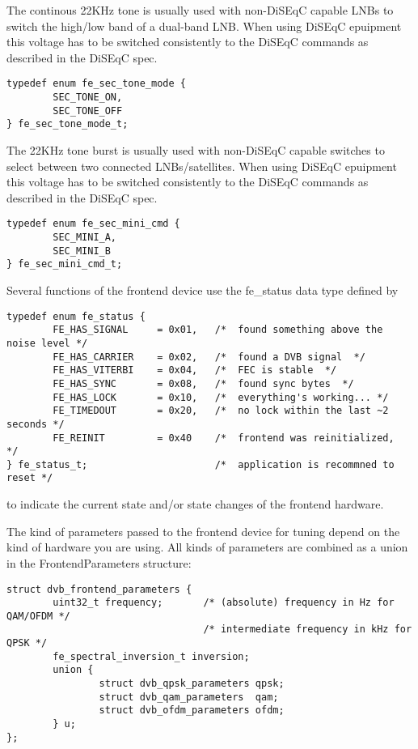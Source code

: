 \label{sectone}

The continous 22KHz tone is usually used with non-DiSEqC capable LNBs to
switch the high/low band of a dual-band LNB.
When using DiSEqC epuipment this voltage has to be switched consistently 
to the DiSEqC commands as described in the DiSEqC spec.

\begin{verbatim}
typedef enum fe_sec_tone_mode {
        SEC_TONE_ON,
        SEC_TONE_OFF
} fe_sec_tone_mode_t;
\end{verbatim}

\label{sectoneburst}

The 22KHz tone burst is usually used with non-DiSEqC capable
switches to select between two connected LNBs/satellites.
When using DiSEqC epuipment this voltage has to be switched consistently 
to the DiSEqC commands as described in the DiSEqC spec.

\begin{verbatim}
typedef enum fe_sec_mini_cmd {
        SEC_MINI_A,
        SEC_MINI_B
} fe_sec_mini_cmd_t;
\end{verbatim}


\label{frontendstatus}

Several functions of the frontend device use the fe\_status data 
type defined by
\begin{verbatim}
typedef enum fe_status {
        FE_HAS_SIGNAL     = 0x01,   /*  found something above the noise level */
        FE_HAS_CARRIER    = 0x02,   /*  found a DVB signal  */
        FE_HAS_VITERBI    = 0x04,   /*  FEC is stable  */
        FE_HAS_SYNC       = 0x08,   /*  found sync bytes  */
        FE_HAS_LOCK       = 0x10,   /*  everything's working... */
        FE_TIMEDOUT       = 0x20,   /*  no lock within the last ~2 seconds */
        FE_REINIT         = 0x40    /*  frontend was reinitialized,  */
} fe_status_t;                      /*  application is recommned to reset */
\end{verbatim}
to indicate the current state and/or state changes of 
the frontend hardware. 


\label{frontendparameters}

The kind of parameters passed to the frontend device for tuning 
depend on the kind of hardware you are using.
All kinds of parameters are combined as a union in the 
FrontendParameters structure:
\begin{verbatim}
struct dvb_frontend_parameters {
        uint32_t frequency;       /* (absolute) frequency in Hz for QAM/OFDM */
                                  /* intermediate frequency in kHz for QPSK */
        fe_spectral_inversion_t inversion;
        union {
                struct dvb_qpsk_parameters qpsk;
                struct dvb_qam_parameters  qam;
                struct dvb_ofdm_parameters ofdm;
        } u;
};
\end{verbatim}

